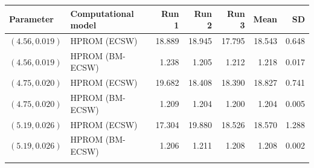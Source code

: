 \begin{tabular}{@{}llrrrrr@{}}
\toprule
Parameter & Computational model & Run 1 & Run 2 & Run 3 & Mean & SD\\
\midrule
$(4.56,0.019)$ & HPROM (ECSW) & 18.889 & 18.945 & 17.795 & 18.543 & 0.648\\
$(4.56,0.019)$ & HPROM (BM-ECSW) & 1.238 & 1.205 & 1.212 & 1.218 & 0.017\\
\addlinespace
$(4.75,0.020)$ & HPROM (ECSW) & 19.682 & 18.408 & 18.390 & 18.827 & 0.741\\
$(4.75,0.020)$ & HPROM (BM-ECSW) & 1.209 & 1.204 & 1.200 & 1.204 & 0.005\\
\addlinespace
$(5.19,0.026)$ & HPROM (ECSW) & 17.304 & 19.880 & 18.526 & 18.570 & 1.288\\
$(5.19,0.026)$ & HPROM (BM-ECSW) & 1.206 & 1.211 & 1.208 & 1.208 & 0.002\\
\addlinespace
\bottomrule
\end{tabular}

